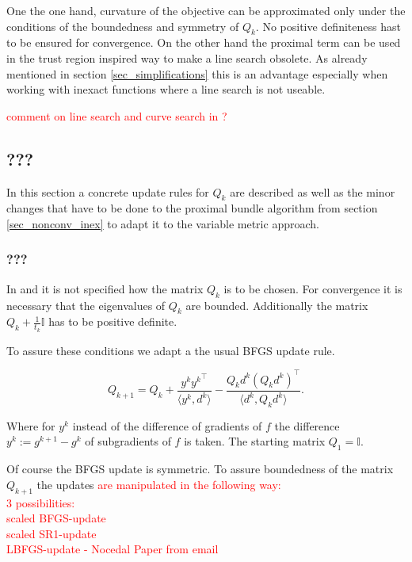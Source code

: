 One the one hand, curvature of the objective can be approximated only under the conditions of the boundedness and symmetry of \(Q_k\). No positive definiteness hast to be ensured for convergence.
On the other hand the proximal term can be used in the trust region inspired way to make a line search obsolete. As already mentioned in section \ref{sec_simplifications} this is an advantage especially when working with inexact functions where a line search is not useable.

\textcolor{red}{comment on line search and curve search in \cite{Lemarechal1994,Lemarechal1997,Vlcek2001}?}

\subsection{???}

In this section a concrete update rules for \(Q_k\) are described as well as the minor changes that have to be done to the proximal bundle algorithm from section \ref{sec_nonconv_inex} to adapt it to the variable metric approach.

\subsubsection{???}

In \cite{Noll2012} and \cite{Noll2013} it is not specified how the matrix \(Q_k\) is to be chosen.
For convergence it is necessary that the eigenvalues of \(Q_k\) are bounded. Additionally the matrix \(Q_k+\frac{1}{t_k}\mathbb{I}\) has to be positive definite.

To assure these conditions we adapt a the usual BFGS update rule.

\begin{equation*}
	Q_{k+1} = Q_k + \frac{y^k{y^k}^{\top}}{\langle y^k,d^k\rangle}-\frac{Q_kd^k(Q_kd^k)^{\top}}{\langle d^k,Q_kd^k \rangle}.
\end{equation*}

Where for \(y^k\) instead of the difference of gradients of \(f\) the difference \(y^k := g^{k+1}-g^k\) of subgradients of \(f\) is taken.
The starting matrix \(Q_1 = \mathbb{I}\).


Of course the BFGS update is symmetric. To assure boundedness of the matrix \(Q_{k+1}\) the updates 
\textcolor{red}{are manipulated in the following way:\\
3 possibilities: \\
scaled BFGS-update\\
scaled SR1-update\\
LBFGS-update - Nocedal Paper from email}

